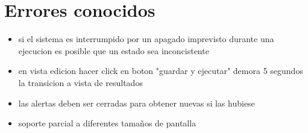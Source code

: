 \section{Errores conocidos}

\begin{itemize}
    \item si el sistema es interrumpido por un apagado imprevisto durante una ejecucion 
        es posible que un estado sea inconcistente

    \item en vista edicion hacer click en boton "guardar y ejecutar" demora 5 segundos la transicion a 
        vista de resultados

    \item las alertas deben ser cerradas para obtener nuevas si las hubiese

    \item soporte parcial a diferentes tamaños de pantalla
\end{itemize}
\newpage